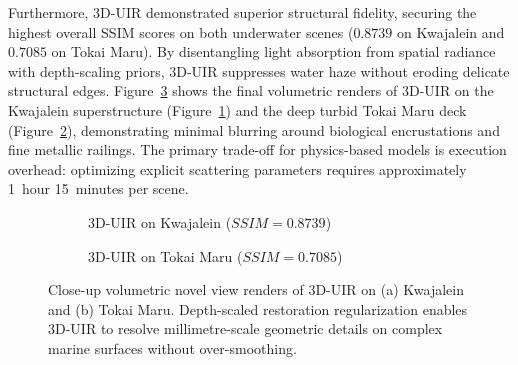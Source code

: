 Furthermore, 3D-UIR demonstrated superior structural fidelity, securing the highest overall SSIM scores on both underwater scenes ($0.8739$ on Kwajalein and $0.7085$ on Tokai Maru). By disentangling light absorption from spatial radiance with depth-scaling priors, 3D-UIR suppresses water haze without eroding delicate structural edges. Figure~\ref{fig:3d_uir_render} shows the final volumetric renders of 3D-UIR on the Kwajalein superstructure (Figure~\ref{fig:3d_uir_kwaj}) and the deep turbid Tokai Maru deck (Figure~\ref{fig:3d_uir_tokai}), demonstrating minimal blurring around biological encrustations and fine metallic railings. The primary trade-off for physics-based models is execution overhead: optimizing explicit scattering parameters requires approximately 1~hour 15~minutes per scene.

\begin{figure}[htbp]
    \centering
    \begin{subfigure}[b]{0.48\textwidth}
        \centering
        \caption{3D-UIR on Kwajalein ($SSIM = 0.8739$)}
        \label{fig:3d_uir_kwaj}
    \end{subfigure}
    \hfill
    \begin{subfigure}[b]{0.48\textwidth}
        \centering
        \caption{3D-UIR on Tokai Maru ($SSIM = 0.7085$)}
        \label{fig:3d_uir_tokai}
    \end{subfigure}
    \caption{Close-up volumetric novel view renders of 3D-UIR on (a) Kwajalein and (b) Tokai Maru. Depth-scaled restoration regularization enables 3D-UIR to resolve millimetre-scale geometric details on complex marine surfaces without over-smoothing.}
    \label{fig:3d_uir_render}
\end{figure}

